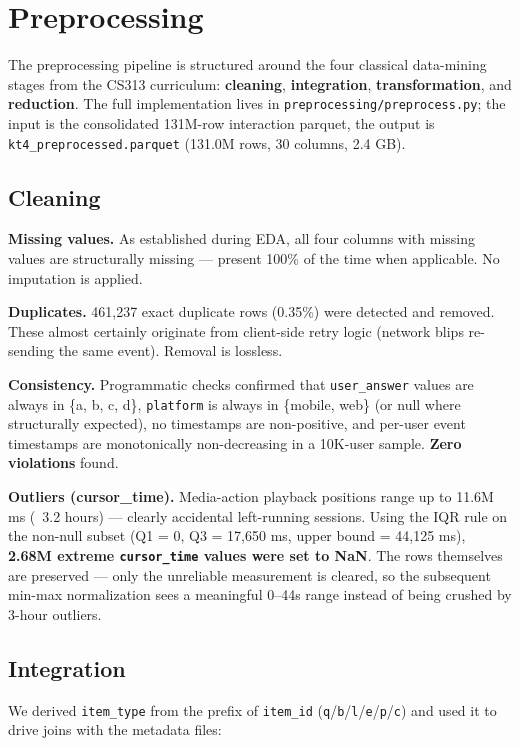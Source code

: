 \section{Preprocessing}

The preprocessing pipeline is structured around the four classical
data-mining stages from the CS313 curriculum: \textbf{cleaning},
\textbf{integration}, \textbf{transformation}, and \textbf{reduction}.
The full implementation lives in \texttt{preprocessing/preprocess.py};
the input is the consolidated 131M-row interaction parquet, the output
is \texttt{kt4\_preprocessed.parquet} (131.0M rows, 30 columns, 2.4 GB).

\subsection{Cleaning}

\textbf{Missing values.} As established during EDA, all four columns
with missing values are structurally missing — present 100\% of the
time when applicable. No imputation is applied.

\textbf{Duplicates.} 461{,}237 exact duplicate rows (0.35\%) were
detected and removed. These almost certainly originate from
client-side retry logic (network blips re-sending the same event).
Removal is lossless.

\textbf{Consistency.} Programmatic checks confirmed that
\texttt{user\_answer} values are always in \{a, b, c, d\},
\texttt{platform} is always in \{mobile, web\} (or null where
structurally expected), no timestamps are non-positive, and per-user
event timestamps are monotonically non-decreasing in a 10K-user
sample. \textbf{Zero violations} found.

\textbf{Outliers (cursor\_time).} Media-action playback positions
range up to 11.6M ms (~3.2 hours) — clearly accidental
left-running sessions. Using the IQR rule on the non-null subset
(Q1 = 0, Q3 = 17{,}650 ms, upper bound = 44{,}125 ms), \textbf{2.68M
extreme \texttt{cursor\_time} values were set to NaN}. The rows
themselves are preserved — only the unreliable measurement is
cleared, so the subsequent min-max normalization sees a meaningful
0--44s range instead of being crushed by 3-hour outliers.

\subsection{Integration}

We derived \texttt{item\_type} from the prefix of \texttt{item\_id}
(\texttt{q}/\texttt{b}/\texttt{l}/\texttt{e}/\texttt{p}/\texttt{c})
and used it to drive joins with the metadata files:

